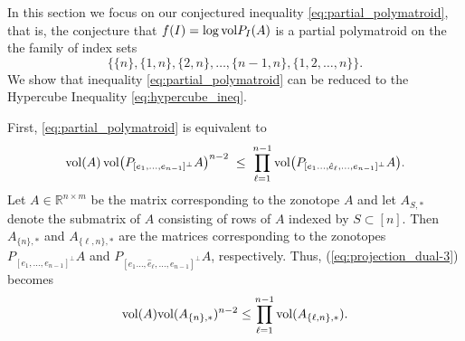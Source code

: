 \documentclass[11pt]{amsart}
\newcommand{\R}{\mathbb R}
\def\vol{{\rm vol}}
\theoremstyle{definition}
\theoremstyle{remark}
\newcommand{\Note}[2]
{
	\todo[inline,color={#1}]
	{#2}
}
\newcommand{\Katja}[1]{\Note{kcolor}{K: #1}}
\begin{document}


In this section we focus on our conjectured inequality \eqref{eq:partial_polymatroid}, that is,  the conjecture that $f(I) = \log \vol P_I(A)$ is a partial polymatroid on the the family of index sets 
    \[
    \{\{n\},\{1,n\},\{2,n\},\ldots, \{n-1,n\},\{1,2,\ldots,n\}\}.
    \]
We show that inequality \eqref{eq:partial_polymatroid} can be reduced to the Hypercube Inequality \eqref{eq:hypercube_ineq}. 

First, \eqref{eq:partial_polymatroid} is equivalent to
\begin{equation}\label{eq:projection_dual-3}
\vol(A) \, \vol\bigl( P_{[e_1,\dots, e_{n-1}]^\perp} A \bigr)^{n-2}
\;\le\; 
\prod_{\ell=1}^{n-1} \vol\bigl( P_{[e_1 \dots, \hat e_\ell,\dots, e_{n-1}]^\perp} A \bigr).
\end{equation}
Let $A\in\R^{n\times m}$ be the matrix corresponding to the zonotope $A$ and let 
$A_{S,\ast}$ denote the submatrix of $A$ consisting of rows of $A$ indexed by
$S\subset[n]$. Then $A_{\{n\},\ast}$ and $A_{\{\ell,n\},\ast}$ are the matrices corresponding to the zonotopes $P_{[e_1,\dots, e_{n-1}]^\perp} A$ and $P_{[e_1 \dots, \hat e_\ell,\dots, e_{n-1}]^\perp}A$, respectively. Thus, (\ref{eq:projection_dual-3}) becomes
\begin{equation}\label{eq:proj_matrix} 
	\vol(A) \vol(A_{\{n\},\ast})^{n-2} \le \prod_{\ell=1}^{n-1}\vol(A_{\{\ell,n\},\ast}).  
\end{equation} 


%
\end{document}
